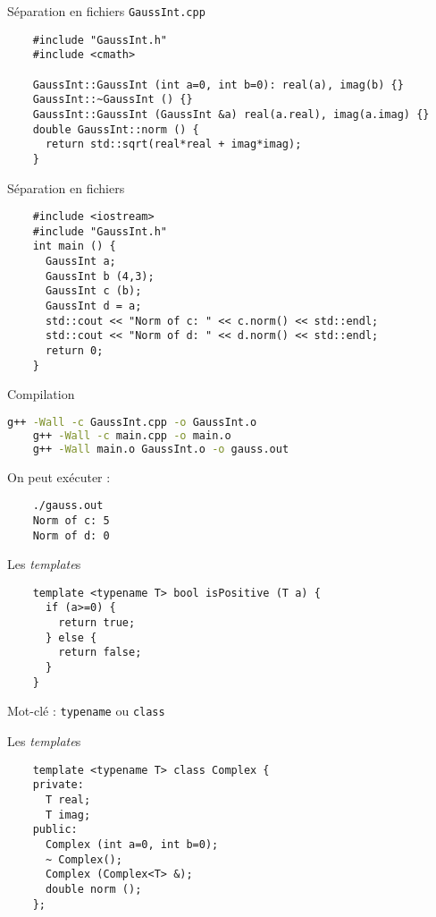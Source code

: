 \begin{frame}[fragile]{Séparation en fichiers}
  \texttt{GaussInt.cpp}
  \begin{lstlisting}
    #include "GaussInt.h"
    #include <cmath>

    GaussInt::GaussInt (int a=0, int b=0): real(a), imag(b) {}
    GaussInt::~GaussInt () {}
    GaussInt::GaussInt (GaussInt &a) real(a.real), imag(a.imag) {}
    double GaussInt::norm () {
      return std::sqrt(real*real + imag*imag);
    }
  \end{lstlisting}
\end{frame}

\begin{frame}[fragile]{Séparation en fichiers}
  \begin{lstlisting}
    #include <iostream>
    #include "GaussInt.h"
    int main () {
      GaussInt a;
      GaussInt b (4,3);
      GaussInt c (b);
      GaussInt d = a;
      std::cout << "Norm of c: " << c.norm() << std::endl;
      std::cout << "Norm of d: " << d.norm() << std::endl;
      return 0;
    }
  \end{lstlisting}
\end{frame}

\begin{frame}[fragile]{Compilation}
  \begin{lstlisting}[language=bash]
    g++ -Wall -c GaussInt.cpp -o GaussInt.o
    g++ -Wall -c main.cpp -o main.o
    g++ -Wall main.o GaussInt.o -o gauss.out
  \end{lstlisting}

  On peut exécuter :
  \begin{lstlisting}
    ./gauss.out
    Norm of c: 5
    Norm of d: 0
  \end{lstlisting}
\end{frame}

\begin{frame}[fragile]{Les \textit{template}s}
  \begin{lstlisting}
    template <typename T> bool isPositive (T a) {
      if (a>=0) {
        return true;
      } else {
        return false;
      }
    }
  \end{lstlisting}

  Mot-clé : \texttt{typename} ou \texttt{class}
\end{frame}

\begin{frame}[fragile]{Les \textit{template}s}
  \begin{lstlisting}
    template <typename T> class Complex {
    private:
      T real;
      T imag;
    public:
      Complex (int a=0, int b=0);
      ~ Complex();
      Complex (Complex<T> &);
      double norm ();
    };
  \end{lstlisting}
\end{frame}

